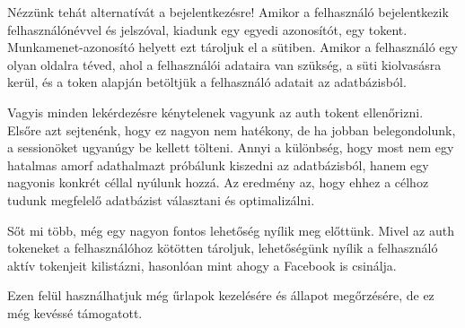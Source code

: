 Nézzünk tehát alternatívát a bejelentkezésre!
Amikor a felhasználó bejelentkezik felhasználónévvel és jelszóval, kiadunk egy egyedi azonosítót, egy tokent. Munkamenet-azonosító helyett ezt tároljuk el a sütiben. Amikor a felhasználó egy olyan oldalra téved, ahol a felhasználói adataira van szükség, a süti kiolvasásra kerül, és a token alapján betöltjük a felhasználó adatait az adatbázisból.

Vagyis minden lekérdezésre kénytelenek vagyunk az auth tokent ellenőrizni. Elsőre azt sejtenénk, hogy ez nagyon nem hatékony, de ha jobban belegondolunk, a sessionöket ugyanúgy be kellett tölteni. Annyi a különbség, hogy most nem egy hatalmas amorf adathalmazt próbálunk kiszedni az adatbázisból, hanem egy nagyonis konkrét céllal nyúlunk hozzá. Az eredmény az, hogy ehhez a célhoz tudunk megfelelő adatbázist választani és optimalizálni.

Sőt mi több, még egy nagyon fontos lehetőség nyílik meg előttünk. Mivel az auth tokeneket a felhasználóhoz kötötten tároljuk, lehetőségünk nyílik a felhasználó aktív tokenjeit kilistázni, hasonlóan mint ahogy a Facebook is csinálja.

Ezen felül használhatjuk még űrlapok kezelésére és állapot megőrzésére, de ez még kevéssé támogatott.






























